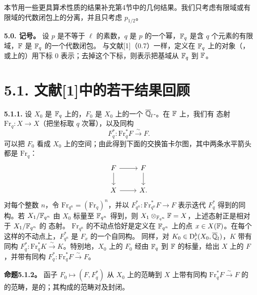 本节用一些更具算术性质的结果补充第4节中的几何结果。我们只考虑有限域或有限域的代数闭包上的分离，并且只考虑 $p_{1/2}$。

\par\medskip\noindent\textbf{5.0. 记号。} 设 $p$ 是不等于 $\ell$ 的素数，$q$ 是 $p$ 的一个幂，$\mathbb F_q$ 是含 $q$ 个元素的有限域，$\mathbb F$ 是 $\mathbb F_q$ 的一个代数闭包。
与文献[1]（0.7）一样，定义在 $\mathbb F_q$ 上的对象（，或上的）用下标 $0$ 表示；去掉这个下标，则表示把基域从 $\mathbb F_q$ 到 $\mathbb F$。

\section*{5.1. 文献[1]中的若干结果回顾}
\par\medskip\noindent\textbf{5.1.1.} 设 $X_0$ 是 $\mathbb F_q$ 上的，$F_0$ 是 $X_0$ 上的一个 $\overline{\mathbb Q}_l$-。在 $\mathbb F$ 上，我们有  态射 $\mathrm{Fr}_q:X\to X$（把坐标取 $q$ 次幂），以及同构
\[
F_q^*:\mathrm{Fr}_q^*F\xrightarrow{\sim}F.
\]
可以把 $F_0$ 看成 $X_0$ 上的空间；由此得到下面的交换笛卡尔图，其中两条水平箭头都是 $\mathrm{Fr}_q$：
\[
\begin{tikzcd}[ampersand replacement=\&]
F\arrow[r]\arrow[d]\&F\arrow[d]\\
X\arrow[r]\&X.
\end{tikzcd}
\]
对每个整数 $n$，令 $\mathrm{Fr}_{q^n}=(\mathrm{Fr}_q)^n$，并以 $F_{q^n}^*:\mathrm{Fr}_{q^n}^*F\to F$ 表示迭代 $F_q^*$ 得到的同构。若 $X_1/\mathbb F_{q^n}$ 由 $X_0$ 标量至 $\mathbb F_{q^n}$ 得到，则 $X_1\otimes_{\mathbb F_{q^n}}\mathbb F=X$，上述态射正是相对于 $X_1/\mathbb F_{q^n}$ 的  态射。
$\mathrm{Fr}_{q^n}$ 的不动点恰好是定义在 $\mathbb F_{q^n}$ 上的点 $x\in X(\mathbb F)$。在每个这样的不动点上，$F_{q^n}^*$ 是 $F_x$ 的一个自同构。
同样，对 $K_0\in \mathrm{D}_c^b(X_0,\overline{\mathbb Q}_l)$，$K$ 带有
同构 $F_q^*:\mathrm{Fr}_q^*K\xrightarrow{\sim}K$。特别地，$X_0$ 上的 $F_0$ 经由 $\mathbb F_q$ 到 $\mathbb F$ 的标量，给出 $X$ 上的 $F$，并带有同构 $F_q^*:\mathrm{Fr}_q^*F\xrightarrow{\sim}F$。

\par\medskip\noindent\textbf{命题5.1.2。} 函子 $F_0\mapsto(F,F_q^*)$ 从 $X_0$ 上的范畴到 $X$ 上带有同构 $\mathrm{Fr}_q^*F\xrightarrow{\sim}F$ 的的范畴，是的；其构成的范畴对及封闭。

